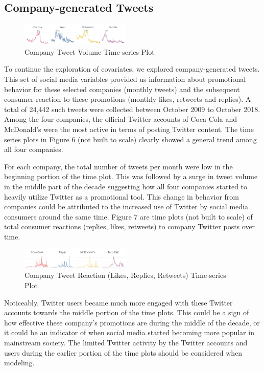 \documentclass[12pt,oneside]{chicagocapstone}
\begin{document}
\hypertarget{company-generated-tweets}{%
\subsection*{Company-generated Tweets}\label{company-generated-tweets}}
\begin{figure}

{\centering \includegraphics[width=200px,angle = 0, scale=2.1]{figure/CompanyTweets} 

}

\caption{Company Tweet Volume Time-series Plot}\label{fig:CompanyTweets}
\end{figure}
To continue the exploration of covariates, we explored company-generated tweets. This set of social media variables provided us information about promotional behavior for these selected companies (monthly tweets) and the subsequent consumer reaction to these promotions (monthly likes, retweets and replies). A total of 24,442 such tweets were collected between October 2009 to October 2018. Among the four companies, the official Twitter accounts of Coca-Cola and McDonald's were the most active in terms of posting Twitter content. The time series plots in Figure 6 (not built to scale) clearly showed a general trend among all four companies.

For each company, the total number of tweets per month were low in the beginning portion of the time plot. This was followed by a surge in tweet volume in the middle part of the decade suggesting how all four companies started to heavily utilize Twitter as a promotional tool. This change in behavior from companies could be attributed to the increased use of Twitter by social media consumers around the same time. Figure 7 are time plots (not built to scale) of total consumer reactions (replies, likes, retweets) to company Twitter posts over time.
\begin{figure}

{\centering \includegraphics[width=200px,angle = 0, scale=2.1]{figure/ConsumerReactionTweets} 

}

\caption{Company Tweet Reaction (Likes, Replies, Retweets) Time-series Plot}\label{fig:ConsumerReactionTweets}
\end{figure}
Noticeably, Twitter users became much more engaged with these Twitter accounts towards the middle portion of the time plots. This could be a sign of how effective these company's promotions are during the middle of the decade, or it could be an indicator of when social media started becoming more popular in mainstream society. The limited Twitter activity by the Twitter accounts and users during the earlier portion of the time plots should be considered when modeling.
\end{document}
